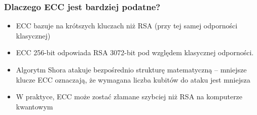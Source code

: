 \begin{frame}
    \frametitle{Dlaczego ECC jest bardziej podatne?}
    \begin{itemize}
        \item ECC bazuje na krótszych kluczach niż RSA (przy tej samej odporności klasycznej)
        \item ECC 256-bit odpowiada RSA 3072-bit pod względem klasycznej odporności.
        \item Algorytm Shora atakuje bezpośrednio strukturę matematyczną – mniejsze klucze ECC oznaczają, że wymagana liczba kubitów do ataku jest mniejsza
        \item W praktyce, ECC może zostać złamane szybciej niż RSA na komputerze kwantowym
    \end{itemize}
\end{frame}








